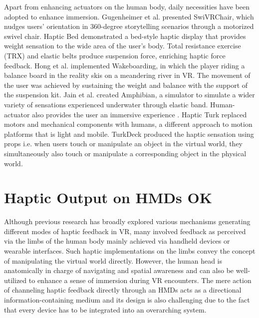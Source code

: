Apart from enhancing actuators on the human body, daily necessities have been adopted to enhance immersion. Gugenheimer et al. \cite{SwiVRChair} presented  SwiVRChair, which nudges users' orientation in 360-degree storytelling scenarios through a motorized swivel chair. Haptic Bed \cite{HapticBed} demonstrated a bed-style haptic display that provides weight sensation to the wide area of the user's body. Total resistance exercise (TRX) and elastic belts produce suspension force, enriching haptic force feedback. Hong et al. \cite{Wakeboarding} implemented Wakeboarding, in which the player riding a balance board in the reality skis on a meandering river in VR. The movement of the user was achieved by sustaining the weight and balance with the support of the suspension kit. Jain et al. \cite{Amphibian} created Amphibian, a simulator to simulate a wider variety of sensations experienced underwater through elastic band. Human-actuator also provides the user an immersive experience \cite{HapticTurk, TurkDeck}. Haptic Turk replaced motors and mechanical components with humans, a different approach to motion platforms that is light and mobile. TurkDeck produced the haptic sensation using props i.e. when users touch or manipulate an object in the virtual world, they simultaneously also touch or manipulate a corresponding object in the physical world. 


\section{Haptic Output on HMDs OK}
Although previous research has broadly explored various mechanisms generating different modes of haptic feedback in VR, many involved feedback as perceived via the limbs of the human body mainly achieved via handheld devices or wearable interfaces. Such haptic implementations on the limbs convey the concept of manipulating the virtual world directly. However, the human head is anatomically in charge of navigating and spatial awareness and can also be well-utilized to enhance a sense of immersion during VR encounters. The mere action of channeling haptic feedback directly through an HMDs acts as a directional information-containing medium and its design is also challenging due to the fact that every device has to be integrated into an overarching system.

